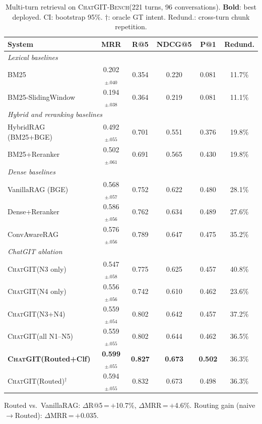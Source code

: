 \documentclass[runningheads]{llncs}
\newcommand{\chatgit}{\textsc{ChatGIT}\xspace}
\newcommand{\conv}{\textsc{ChatGIT-Bench}\xspace}
\begin{document}
\begin{table}[H]
\centering
\caption{Multi-turn retrieval on \conv (221 turns, 96 conversations).
\textbf{Bold}: best deployed. CI: bootstrap 95\%.
$\dagger$: oracle GT intent. Redund.: cross-turn chunk repetition.}
\label{tab:multiturn}
\footnotesize
\begin{tabular}{lccccc}
\toprule
System & MRR & R@5 & NDCG@5 & P@1 & Redund. \\
\midrule
\multicolumn{6}{l}{\textit{Lexical baselines}} \\
\rowcolor{gray!8}
BM25 & 0.202$_{\pm.040}$ & 0.354 & 0.220 & 0.081 & 11.7\% \\
BM25-SlidingWindow & 0.194$_{\pm.038}$ & 0.364 & 0.219 & 0.081 & 11.1\% \\
\multicolumn{6}{l}{\textit{Hybrid and reranking baselines}} \\
HybridRAG (BM25+BGE) & 0.492$_{\pm.055}$ & 0.701 & 0.551 & 0.376 & 19.8\% \\
BM25+Reranker & 0.502$_{\pm.061}$ & 0.691 & 0.565 & 0.430 & 19.8\% \\
\multicolumn{6}{l}{\textit{Dense baselines}} \\
VanillaRAG (BGE) & 0.568$_{\pm.057}$ & 0.752 & 0.622 & 0.480 & 28.1\% \\
Dense+Reranker & 0.586$_{\pm.056}$ & 0.762 & 0.634 & 0.489 & 27.6\% \\
ConvAwareRAG & 0.576$_{\pm.056}$ & 0.789 & 0.647 & 0.475 & 35.2\% \\
\midrule
\multicolumn{6}{l}{\textit{ChatGIT ablation}} \\
\chatgit (N3 only) & 0.547$_{\pm.058}$ & 0.775 & 0.625 & 0.457 & 40.8\% \\
\chatgit (N4 only) & 0.556$_{\pm.056}$ & 0.742 & 0.610 & 0.462 & 23.6\% \\
\chatgit (N3+N4) & 0.559$_{\pm.054}$ & 0.802 & 0.642 & 0.457 & 37.2\% \\
\chatgit (all N1--N5) & 0.559$_{\pm.055}$ & 0.802 & 0.644 & 0.462 & 36.5\% \\
\rowcolor{cIndigo!8}
\textbf{\chatgit (Routed+Clf)} & \textbf{0.599}$_{\pm.055}$ & \textbf{0.827}
  & \textbf{0.673} & \textbf{0.502} & 36.3\% \\
\rowcolor{cIndigo!8}
\chatgit (Routed)$^{\dagger}$ & 0.594$_{\pm.055}$ & 0.832 & 0.673 & 0.498 & 36.3\% \\
\bottomrule
\end{tabular}
\vspace{2pt}
{\footnotesize
Routed vs.\ VanillaRAG: $\Delta$R@5\,=\,$+$10.7\%, $\Delta$MRR\,=\,$+$4.6\%.
Routing gain (naive$\to$Routed): $\Delta$MRR\,=\,$+$0.035.
}
\end{table}
\end{document}
